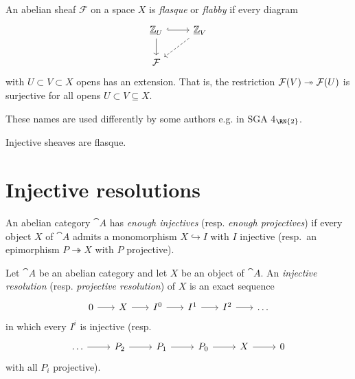 \documentclass[../main.tex]{subfiles}
\begin{document}
\begin{defn}
    An abelian sheaf \(\mathcal F\) on a space \(X\) is \emph{flasque} or \emph{flabby} if every diagram
    \[\begin{tikzcd}
    	{\underline{\bb Z}_U} & {\underline{\bb Z}_V} \\
    	{\sh F}
    	\arrow[hook, from=1-1, to=1-2]
    	\arrow[from=1-1, to=2-1]
    	\arrow[dashed, from=1-2, to=2-1]
    \end{tikzcd}\]
    with $U\subset V\subset X$ opens has an extension.
    That is, the restriction $\mathcal{F}(V) \twoheadrightarrow \mathcal F(U)$ is surjective for all opens $U\subset V\subseteq X$. 
\end{defn}

\begin{rmk}
    These names are used differently by some authors e.g. in SGA 4$_{\RN{2}}$.
\end{rmk}

\begin{exmp}\label{exmp:injective-sheaves-are-flasque}
    Injective sheaves are flasque.
\end{exmp}

\section{Injective resolutions}


\begin{defn}
    An abelian category $\cat A$ has \emph{enough injectives} (resp. \emph{enough projectives}) if every object \(X\) of \(\cat A\) admits a monomorphism $X\hookrightarrow I$ with $I$ injective (resp.~an epimorphism $P\twoheadrightarrow X$ with $P$ projective).
\end{defn}

\begin{defn}
    Let $\cat A$ be an abelian category and let \(X\) be an object of \(\cat A\). An \emph{injective resolution}  (resp. \emph{projective resolution}) of $X$ is an exact sequence
    \[\begin{tikzcd}[column sep=scriptsize]
        0 \ar[r] & X \ar[r] & I^0 \ar[r] & I^1\ar[r] & I^2 \ar[r] & \dots
    \end{tikzcd}\]
    in which every $I^i$ is injective (resp.
    \[\begin{tikzcd}
        \dots \ar[r] & P_2 \ar[r] & P_1 \ar[r] & P_0 \ar[r] & X \ar[r] & 0
    \end{tikzcd}\]
    with all $P_i$ projective).
\end{defn}
\end{document}
